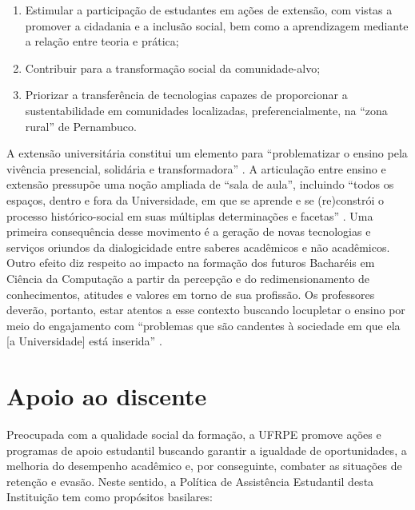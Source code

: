 \documentclass[
	12pt,				%
	openright,			%
  oneside,     %
	a4paper,			%
 hyphens,
	chapter=TITLE,		%
	english,			%
	french,				%
	spanish,			%
	brazil				%
	]{abntex2}
\begin{document}
\begin{enumerate}[label=(\alph*)]
    \item Estimular a participação de estudantes em ações de extensão, com vistas a promover a cidadania e a inclusão social, bem como a aprendizagem mediante a relação entre teoria e prática;
    \item Contribuir para a transformação social da comunidade-alvo;
    \item Priorizar a transferência de tecnologias capazes de proporcionar a sustentabilidade em comunidades localizadas, preferencialmente, na “zona rural” de Pernambuco. 	
\end{enumerate}

A extensão universitária constitui um elemento para “problematizar o ensino pela vivência presencial, solidária e transformadora” \cite{carpes2010ensino}. A articulação entre ensino e extensão pressupõe uma noção ampliada de “sala de aula”, incluindo “todos os espaços, dentro e fora da Universidade, em que se aprende e se (re)constrói o processo histórico-social em suas múltiplas determinações e facetas” \cite{forproex2012forum}. Uma primeira consequência desse movimento é a geração de novas tecnologias e serviços oriundos da dialogicidade entre saberes acadêmicos e não acadêmicos. Outro efeito diz respeito ao impacto na formação dos futuros Bacharéis em Ciência da Computação a partir da percepção e do redimensionamento de conhecimentos, atitudes e valores em torno de sua profissão. Os professores deverão, portanto, estar atentos a esse contexto buscando locupletar o ensino por meio do engajamento com “problemas que são candentes à sociedade em que ela [a Universidade] está inserida” \cite{barbieri2010escola}.  


%
%



\chapter{Apoio ao discente}
\label{cap_apoio_ao_discente}

Preocupada com a qualidade social da formação, a UFRPE promove ações e programas de apoio estudantil buscando garantir a igualdade de oportunidades, a melhoria do desempenho acadêmico e, por conseguinte, combater as situações de retenção e evasão. Neste sentido, a Política de Assistência Estudantil desta Instituição tem como propósitos basilares:
\end{document}
